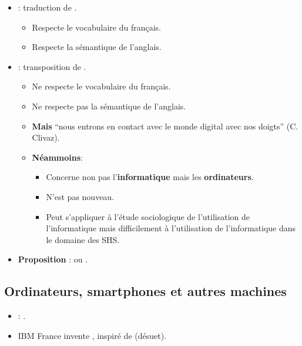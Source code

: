 \begin{slide}
	\begin{itemize}
		\item {} : traduction de .
		\begin{itemize}
			\item Respecte le vocabulaire du français.
			\item Respecte la sémantique de l'anglais.
		\end{itemize}
		
		\item {} : transposition de .
			\begin{itemize}
				\item Ne respecte le vocabulaire du français.
				\item Ne respecte pas la sémantique de l'anglais.
				\item \textbf{Mais} \enquote{nous entrons en contact avec le monde digital avec nos doigts} (C. Clivaz). %
				\item \textbf{Néammoins}:
				\begin{itemize}
					\item Concerne non pas l'\textbf{informatique} mais les \textbf{ordinateurs}.
					\item N'est pas nouveau.
					\item Peut s'appliquer à l'étude sociologique de l'utilisation de l'informatique mais difficilement à l'utilisation de l'informatique dans le domaine des SHS.
				\end{itemize}
			\end{itemize}
		\item \textbf{Proposition} :  ou .
	\end{itemize}
\end{slide}
\subsection{Ordinateurs, smartphones et autres machines}

\begin{slide}
	\begin{itemize}
		\item {} : .
		\item IBM France invente , inspiré de  (désuet).
	\end{itemize}
\end{slide}

